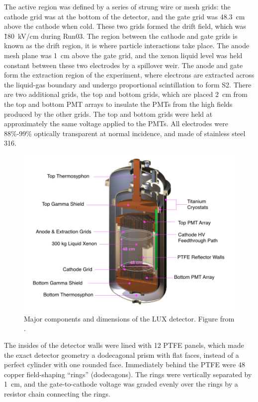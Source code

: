 The active region was defined by a series of strung wire or mesh grids: the cathode grid was at the bottom of the detector, and the gate grid was 48.3~cm above the cathode when cold. These two grids formed the drift field, which was \~180~kV/cm during Run03. The region between the cathode and gate grids is known as the drift region, it is where particle interactions take place. The anode mesh plane was 1~cm above the gate grid, and the xenon liquid level was held constant between these two electrodes by a spillover weir. The anode and gate form the extraction region of the experiment, where electrons are extracted across the liquid-gas boundary and undergo proportional scintillation to form S2. There are two additional grids, the top and bottom grids, which are placed 2~cm from the top and bottom \ac{PMT} arrays to insulate the \ac{PMT}s from the high fields produced by the other grids. The top and bottom grids were held at approximately the same voltage applied to the \ac{PMT}s. All electrodes were 88\%-99\% optically transparent at normal incidence, and made of stainless steel 316.

\begin{figure}[htbp]
\begin{center}
\includegraphics[width=\textwidth]{figures/lux/lux_inner1.png}
\caption{Major components and dimensions of the \acs{LUX} detector. Figure from \cite{LUXDetectorPaper}. }
\label{fig:lux1}
\end{center}
\end{figure}


The insides of the detector walls were lined with 12 \ac{PTFE} panels, which made the exact detector geometry a dodecagonal prism with flat faces, instead of a perfect cylinder with one rounded face. Immediately behind the \ac{PTFE} were 48 copper field-shaping ``rings'' (dodecagons). The rings were vertically separated by 1~cm, and the gate-to-cathode voltage was graded evenly over the rings by a resistor chain connecting the rings. 


